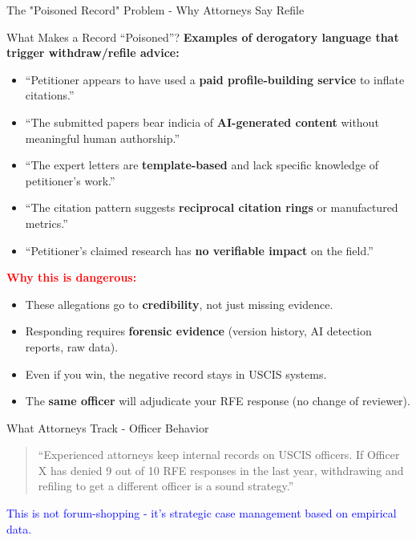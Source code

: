 \documentclass[11pt]{beamer}
\begin{document}
	\begin{frame}{The "Poisoned Record" Problem - Why Attorneys Say Refile}
		\scriptsize
		\begin{block}{What Makes a Record ``Poisoned''?}
			\textbf{Examples of derogatory language that trigger withdraw/refile advice:}
			\begin{itemize}
				\item ``Petitioner appears to have used a \textbf{paid profile-building service} to inflate citations.''
				\item ``The submitted papers bear indicia of \textbf{AI-generated content} without meaningful human authorship.''
				\item ``The expert letters are \textbf{template-based} and lack specific knowledge of petitioner's work.''
				\item ``The citation pattern suggests \textbf{reciprocal citation rings} or manufactured metrics.''
				\item ``Petitioner's claimed research has \textbf{no verifiable impact} on the field.''
			\end{itemize}
			\textcolor{red}{\textbf{Why this is dangerous:}}
			\begin{itemize}
				\item These allegations go to \textbf{credibility}, not just missing evidence.
				\item Responding requires \textbf{forensic evidence} (version history, AI detection reports, raw data).
				\item Even if you win, the negative record stays in USCIS systems.
				\item The \textbf{same officer} will adjudicate your RFE response (no change of reviewer).
			\end{itemize}
		\end{block}
		
		\begin{block}{What Attorneys Track - Officer Behavior}
			\begin{quote}
				``Experienced attorneys keep internal records on USCIS officers. If Officer X has denied 9 out of 10 RFE responses in the last year, withdrawing and refiling to get a different officer is a sound strategy.''
			\end{quote}
			\textcolor{blue}{This is not forum-shopping - it's strategic case management based on empirical data.}
		\end{block}
	\end{frame}
	
\end{document}
